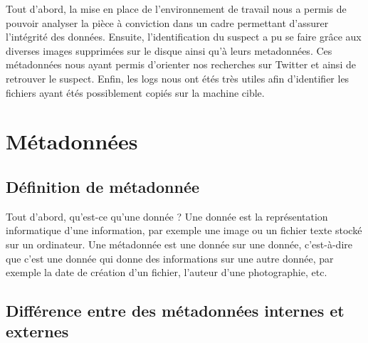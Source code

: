 \documentclass[a4paper]{article}
\begin{document}
Tout d'abord, la mise en place de l'environnement de travail nous a permis de pouvoir analyser la pièce à conviction dans un cadre permettant d'assurer l'intégrité des données. Ensuite, l'identification du suspect a pu se faire grâce aux diverses images supprimées sur le disque ainsi qu'à leurs metadonnées. Ces métadonnées nous ayant permis d'orienter nos recherches sur Twitter et ainsi de retrouver le suspect. Enfin, les logs nous ont étés très utiles afin d'identifier les fichiers ayant étés possiblement copiés sur la machine cible.




















\appendix




















\section{Métadonnées}





\subsection{Définition de métadonnée}

Tout d'abord, qu'est-ce qu'une donnée ? Une donnée est la représentation informatique d'une information, par exemple une image ou un fichier texte stocké sur un ordinateur. Une métadonnée est une donnée sur une donnée, c'est-à-dire que c'est une donnée qui donne des informations sur une autre donnée, par exemple la date de création d'un fichier, l'auteur d'une photographie, etc.





\subsection{Différence entre des métadonnées internes et externes}
\end{document}
